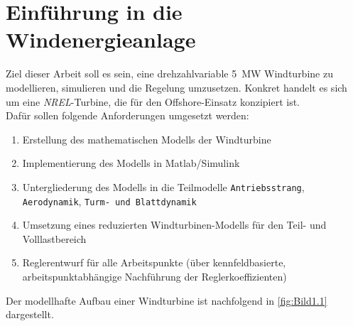 \section{Einführung in die Windenergieanlage} \label{einfuehrung}

Ziel dieser Arbeit soll es sein, eine drehzahlvariable \SI{5}{MW} Windturbine zu modellieren, simulieren und die Regelung umzusetzen. Konkret handelt es sich um eine \textit{NREL}-Turbine, die für den Offshore-Einsatz konzipiert ist.\\
Dafür sollen folgende Anforderungen umgesetzt werden:

\begin{enumerate}
    \item Erstellung des mathematischen Modells der Windturbine
    \item Implementierung des Modells in Matlab/Simulink
    \item Untergliederung des Modells in die Teilmodelle \texttt{Antriebsstrang}, \texttt{Aerodynamik}, \texttt{Turm- und Blattdynamik}
    \item Umsetzung eines reduzierten Windturbinen-Modells für den Teil- und Volllastbereich
    \item Reglerentwurf für alle Arbeitspunkte (über kennfeldbasierte, arbeitspunktabhängige Nachführung der Reglerkoeffizienten)
\end{enumerate}

Der modellhafte Aufbau einer Windturbine ist nachfolgend in \autoref{fig:Bild1.1} dargestellt.

